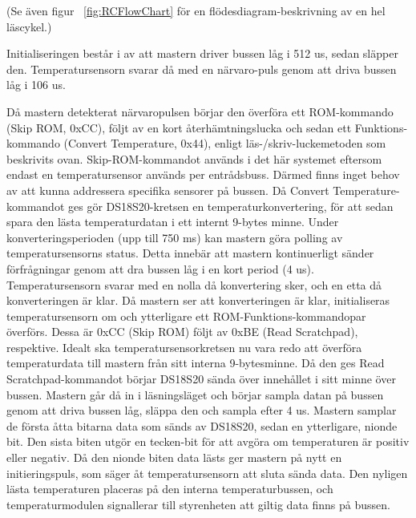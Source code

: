 \documentclass[a4paper,11pt]{article}
\begin{document}
	(Se även figur ~\ref{fig:RCFlowChart} för en flödesdiagram-beskrivning av en hel läscykel.)

	Initialiseringen består i av att mastern driver bussen låg i 512 us, sedan släpper den.
	Temperatursensorn svarar då med en närvaro-puls genom att driva bussen låg i 106 us.

	Då mastern detekterat närvaropulsen börjar den överföra ett ROM-kommando (Skip ROM, 0xCC), följt av en kort återhämtningslucka och sedan ett Funktions-kommando (Convert Temperature, 0x44), enligt läs-/skriv-luckemetoden som beskrivits ovan.
	Skip-ROM-kommandot används i det här systemet eftersom endast en temperatursensor används per entrådsbuss.
	Därmed finns inget behov av att kunna addressera specifika sensorer på bussen.
	Då Convert Temperature-kommandot ges gör DS18S20-kretsen en temperaturkonvertering, för att sedan spara den lästa temperaturdatan i ett internt 9-bytes minne.
	Under konverteringsperioden (upp till 750 ms) kan mastern göra polling av temperatursensorns status. Detta innebär att mastern kontinuerligt
	sänder förfrågningar genom att dra bussen låg i en kort period (4 us). Temperatursensorn svarar med en nolla
	då konvertering sker, och en etta då konverteringen är klar.
	Då mastern ser att konverteringen är klar, initialiseras temperatursensorn om och ytterligare ett ROM-Funktions-kommandopar överförs. Dessa är 0xCC (Skip ROM) följt av 0xBE (Read Scratchpad), respektive.
	Idealt ska temperatursensorkretsen nu vara redo att överföra temperaturdata till mastern från sitt interna 9-bytesminne.
	Då den ges Read Scratchpad-kommandot börjar DS18S20 sända över innehållet i sitt minne över bussen.
	Mastern går då in i läsningsläget och börjar sampla datan på bussen genom att driva bussen låg, släppa den och sampla efter 4 us.
	Mastern samplar de första åtta bitarna data som sänds av DS18S20, sedan en ytterligare, nionde bit. 
	Den sista biten utgör en tecken-bit för att avgöra om temperaturen är positiv eller negativ. Då den nionde biten data lästs
	ger mastern på nytt en initieringspuls, som säger åt temperatursensorn att sluta sända data.
	Den nyligen lästa temperaturen placeras på den interna temperaturbussen, och temperaturmodulen signallerar till styrenheten att giltig data finns på bussen.
\end{document}

